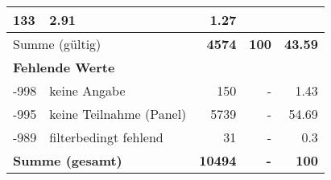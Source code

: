 \begin{longtable}{lXrrr}
       \num{133} &
       \num[round-mode=places,round-precision=2]{2,91} &
         \num[round-mode=places,round-precision=2]{1,27} \\
     \midrule
     \multicolumn{2}{l}{Summe (gültig)} &
       \textbf{\num{4574}} &
     \textbf{100} &
       \textbf{\num[round-mode=places,round-precision=2]{43,59}} \\
     \multicolumn{5}{l}{\textbf{Fehlende Werte}}\\
       -998 &
       keine Angabe &
         \num{150} &
        - &
         \num[round-mode=places,round-precision=2]{1,43} \\
       -995 &
       keine Teilnahme (Panel) &
         \num{5739} &
        - &
         \num[round-mode=places,round-precision=2]{54,69} \\
       -989 &
       filterbedingt fehlend &
         \num{31} &
        - &
         \num[round-mode=places,round-precision=2]{0,3} \\
     \midrule
     \multicolumn{2}{l}{\textbf{Summe (gesamt)}} &
          \textbf{\num{10494}} &
        \textbf{-} &
        \textbf{100} \\
     \bottomrule
     \end{longtable}
     
